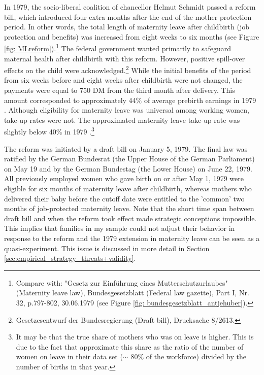 \documentclass[11pt, a4paper]{article} %
\begin{document}
In 1979, the socio-liberal coalition of chancellor Helmut Schmidt passed a reform bill, which introduced four extra months after the end of the mother protection period. In other words, the total length of maternity leave after childbirth (job protection and benefits) was increased from eight weeks to six months (see Figure \ref{fig: MLreform}).\footnote{Compare with: "Gesetz zur Einführung eines Mutterschutzurlaubes" (Maternity leave law), Bundesgesetzblatt (Federal law gazette), Part I, Nr. 32, p.797-802, 30.06.1979 (see Figure \ref{fig: bundesgesetzblatt_antjehuber}).} The federal government wanted primarily to safeguard maternal health after childbirth with this reform. However, positive spill-over effects on the child were acknowledged.\footnote{Gesetzesentwurf der Bundesregierung (Draft bill), Drucksache 8/2613.} While the initial benefits of the period from six weeks before and eight weeks after childbirth were not changed, the payments were equal to 750 DM from the third month after delivery. This amount corresponded to approximately 44\% of average prebirth earnings in 1979 \citep{schonberg2014expansions}. Although eligibility for maternity leave was universal among working women, take-up rates were not. The approximated maternity leave take-up rate was slightly below 40\% in 1979 \citep{Dustmann2012}.\footnote{It may be that the true share of mothers who was on leave is higher. This is due to the fact that \cite{Dustmann2012} approximate this share as the ratio of the number of women on leave in their data set ($\sim$ 80\% of the workforce) divided by the number of births in that year.}
\newline

The reform was initiated by a draft bill on January 5, 1979. The final law was ratified by the German Bundesrat (the Upper House of the German Parliament) on May 19 and by the German Bundestag (the Lower House) on June 22, 1979. All previously employed women who gave birth on or after May 1, 1979 were eligible for six months of maternity leave after childbirth, whereas mothers who delivered their baby before the cutoff date were entitled to the 'common' two months of job-protected maternity leave. Note that the short time span between draft bill and when the reform took effect made strategic conceptions impossible. This implies that families in my sample could not adjust their behavior in response to the reform and the 1979 extension in maternity leave can be seen as a quasi-experiment. This issue is discussed in more detail in Section \ref{sec:empirical_strategy_threats+validity}.\newline
\end{document}
